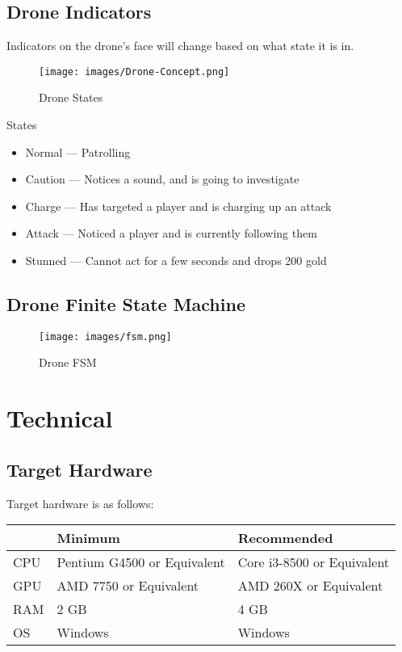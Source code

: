 \documentclass[10pt]{report}
\begin{document}
\section{Drone Indicators}

Indicators on the drone's face will change based on what state it is in.

\begin{figure}[H]
    \centering
    \texttt{[image: images/Drone-Concept.png]}
    \caption{Drone States}
\end{figure}

States

\begin{itemize}
    \item Normal --- Patrolling
    \item Caution --- Notices a sound, and is going to investigate
    \item Charge --- Has targeted a player and is charging up an attack
    \item Attack --- Noticed a player and is currently following them
    \item Stunned --- Cannot act for a few seconds and drops 200 gold
\end{itemize}

\section{Drone Finite State Machine}

\begin{figure}[H]
    \centering
	\texttt{[image: images/fsm.png]}
	\caption{Drone FSM}
\end{figure}

\chapter{Technical}

\section{Target Hardware}

Target hardware is as follows:

\begin{center}
    \begin{tabular}{|l|l|l|}
        \hline
        & Minimum & Recommended \\ \hline
        CPU & Pentium G4500 or Equivalent & Core i3-8500 or Equivalent \\ \hline
        GPU & AMD 7750 or Equivalent & AMD 260X or Equivalent \\ \hline
        RAM & 2 GB & 4 GB \\ \hline
        OS & Windows & Windows \\
        \hline
    \end{tabular}
\end{center}
\end{document}
